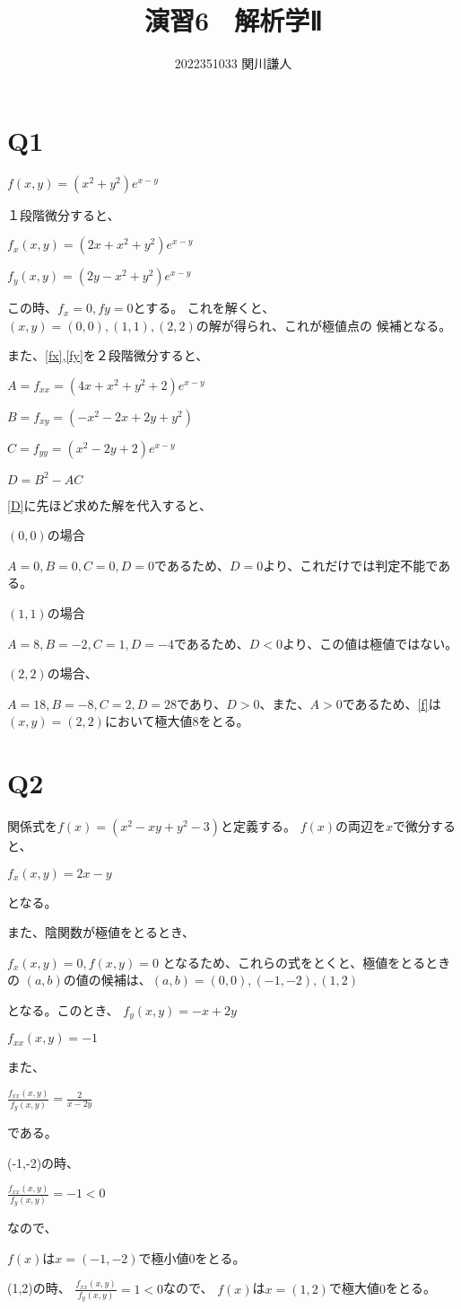 \documentclass[a4paper]{ltjsarticle}
\begin{document}
\title{演習6　解析学Ⅱ}
\author{2022351033 関川謙人}
\maketitle
\section{Q1}

$f(x,y)=(x^{2}+y^{2})e^{x-y}$\label{f}

１段階微分すると、

$f_{x}(x,y)=(2x+x^{2}+y^{2})e^{x-y}$\label{fx}

$f_{y}(x,y)=(2y-x^{2}+y^{2})e^{x-y}$\label{fy}

この時、$f_{x}=0,f{y}=0$とする。
これを解くと、$(x,y)=(0,0),(1,1),(2,2)$の解が得られ、これが極値点の
候補となる。

また、\ref{fx},\ref{fy}を２段階微分すると、

$A=f_{xx}=(4x+x^{2}+y^{2}+2)e^{x-y}$\label{A}

$B=f_{xy}=(-x^{2}-2x+2y+y^{2})$\label{B}

$C=f_{yy}=(x^{2}-2y+2)e^{x-y}$\label{C}

$D=B^{2}-AC$\label{D}

\ref{D}に先ほど求めた解を代入すると、

$(0,0)$の場合

$A=0,B=0,C=0,D=0$であるため、$D=0$より、これだけでは判定不能である。

$(1,1)$の場合

$A=8,B=-2,C=1,D=-4$であるため、$D<0$より、この値は極値ではない。

$(2,2)$の場合、

$A=18,B=-8,C=2,D=28$であり、$D>0$、また、$A>0$であるため、\ref{f}は
$(x,y)=(2,2)$において極大値$8$をとる。

\section{Q2}
関係式を$f(x)=(x^{2}-xy+y^{2}-3)$と定義する。
$f(x)$の両辺を$x$で微分すると、

$f_{x}(x,y)=2x-y$

となる。

また、陰関数が極値をとるとき、

$f_{x}(x,y)=0,f(x,y)=0$
となるため、これらの式をとくと、極値をとるときの
$(a,b)$の値の候補は、$(a,b)=(0,0),(-1,-2),(1,2)$

となる。このとき、
$f_{y}(x,y)=-x+2y$

$f_{xx}(x,y)=-1$

また、

$\frac{f_{xx}(x,y)}{f_{y}(x,y)}=
\frac{2}{x-2y} $

である。

(-1,-2)の時、

$\frac{f_{xx}(x,y)}{f_{y}(x,y)}=-1<0$

なので、


$f(x)$は$x=(-1,-2)$で極小値$0$をとる。

(1,2)の時、
$\frac{f_{xx}(x,y)}{f_{y}(x,y)}=1<0$なので、
$f(x)$は$x=(1,2)$で極大値$0$をとる。
\end{document}

